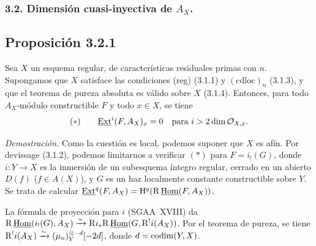 \subsubsection*{3.2. Dimensión cuasi-inyectiva de $A_X$.}

\subsection*{Proposición 3.2.1}
Sea $X$ un esquema regular, de características residuales primas con $n$. Supongamos que $X$ satisface las condiciones (reg) (3.1.1) y $(\mathrm{cdloc})_n$ (3.1.3), y que el teorema de pureza absoluta es válido sobre $X$ (3.1.4). Entonces, para todo $A_X$-módulo constructible $F$ y todo $x \in X$, se tiene
\[
(*) \qquad \underline{\operatorname{Ext}}^i(F, A_X)_x = 0 \quad \text{para } i > 2\dim \mathcal{O}_{X,x}.
\]

\emph{Demostración.} Como la cuestión es local, podemos suponer que $X$ es afín. Por devissage (3.1.2), podemos limitarnos a verificar $(*)$ para $F = i_{!}(G)$, donde $i : Y \to X$ es la inmersión de un subesquema íntegro regular, cerrado en un abierto $D(f)$ ($f \in A(X)$), y $G$ es un haz localmente constante constructible sobre $Y$. Se trata de calcular $\underline{\operatorname{Ext}}^q(F, A_X) = \mathrm{H}^q(\mathrm{R}\,\underline{\operatorname{Hom}}(F, A_X))$.

La fórmula de proyección para $i$ (SGAA~XVIII) da $\mathrm{R}\,\underline{\operatorname{Hom}}(i_{!}(G), A_X) \xrightarrow{\sim} \mathrm{R} i_{*} \mathrm{R}\,\underline{\operatorname{Hom}}(G, \mathrm{R}^{!}i(A_X))$. Por el teorema de pureza, se tiene $\mathrm{R}^{!}i(A_X) \xrightarrow{\sim} (\mu_n)^{\otimes -d}_Y[-2d]$, donde $d = \operatorname{codim}(Y,X)$.

